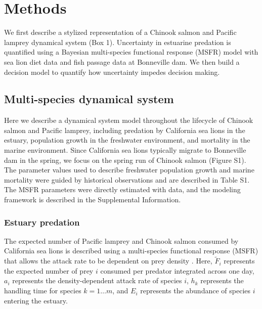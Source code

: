 \documentclass{article}
\begin{document}
\nocite{mmpa_sec120, wargo2019changes, CRITFC_2011, roffe1984abundances, beamish1980adult, weitkamp2015seasonal, close2002ecological, close2004traditional, kostow2002oregon, tidwell2023pinniped}

\section*{Methods}

We first describe a stylized representation of a Chinook salmon and Pacific lamprey dynamical system (Box 1). Uncertainty in estuarine predation is quantified using a Bayesian multi-species functional response (MSFR) model with sea lion diet data and fish passage data at Bonneville dam. We then build a decision model to quantify how uncertainty impedes decision making.

\subsection*{Multi-species dynamical system}

Here we describe a dynamical system model throughout the lifecycle of Chinook salmon and Pacific lamprey, including predation by California sea lions in the estuary, population growth in the freshwater environment, and mortality in the marine environment. Since California sea lions typically migrate to Bonneville dam in the spring, we focus on the spring run of Chinook salmon (Figure S1). The parameter values used to describe freshwater population growth and marine mortality were guided by historical observations and are described in Table S1. The MSFR parameters were directly estimated with data, and the modeling framework is described in the Supplemental Information.

\subsubsection*{Estuary predation}

The expected number of Pacific lamprey and Chinook salmon consumed by California sea lions is described using a multi-species functional response (MSFR) that allows the attack rate to be dependent on prey density \parencite{rosenbaum2024towards}. Here, $\widetilde{F}_i$ represents the expected number of prey $i$ consumed per predator integrated across one day, $a_i$ represents the density-dependent attack rate of species $i$, $h_k$ represents the handling time for species $k = 1 \dots m$, and $E_i$ represents the abundance of species $i$ entering the estuary. 
\end{document}
